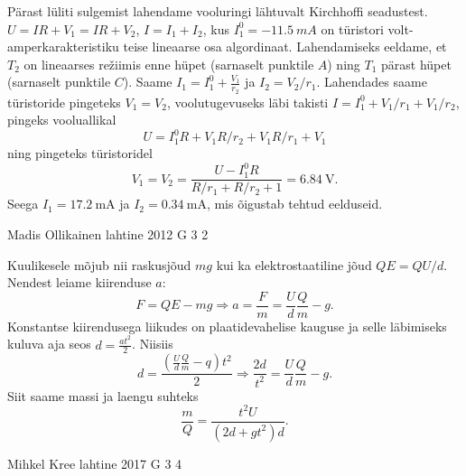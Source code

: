 \documentclass[11pt]{article}
\begin{document}
{{\begin{figure}[h]
\begin{center}
\end{center}
\end{figure}
Pärast lüliti sulgemist lahendame vooluringi lähtuvalt Kirchhoffi seadustest. $U = IR + V_1 = IR + V_2$, $I = I_1 + I_2$, kus $I_1^0=\SI{-11.5}{mA}$ on türistori volt-amperkarakteristiku teise lineaarse osa algordinaat.
Lahendamiseks eeldame, et $T_2$ on lineaarses režiimis enne hüpet (sarnaselt punktile $A$) ning $T_1$ pärast hüpet (sarnaselt punktile $C$). Saame $I_1 = I_1^0 + \frac{V_1}{r_2}$ ja $I_2 = V_2/r_1$. Lahendades saame türistoride pingeteks $V_1 = V_2$, voolutugevuseks läbi takisti $I = I_1^0 + V_1/r_1 + V_1/r_2$, pingeks vooluallikal
\[
U = I_1^0R + V_1R/r_2 + V_1R/r_1 + V_1
\]
ning pingeteks türistoridel
\[
V_1 = V_2 = \frac{U - I_1^0R}{R/r_1 + R/r_2 + 1} = \SI{6.84}{\volt}.
\]
Seega $I_1 = \SI{17.2}{\milli\ampere}$ ja $I_2 = \SI{0.34}{\milli\ampere}$, mis õigustab tehtud eelduseid. 
\fi
}

{Madis Ollikainen} %
{lahtine} %
{2012} %
{G 3} %
{2} %
{

\ifSolution
Kuulikesele mõjub nii raskusjõud $mg$ kui ka elektrostaatiline jõud $QE=QU/d$. Nendest leiame kiirenduse $a$:
\[ F = QE - mg \Rightarrow a = \frac{F}{m} = \frac{U}{d}\frac{Q}{m} - g. \]
Konstantse kiirendusega liikudes on plaatidevahelise kauguse ja selle läbimiseks kuluva aja seos $ d = \frac{at^2}{2} $. Niisiis
\[ d = \frac{\left(\frac{U}{d}\frac{Q}{m} - q\right)t^2}{2} \Rightarrow \frac{2d}{t^2} = \frac{U}{d}\frac{Q}{m} - g. \]
Siit saame massi ja laengu suhteks
\[ \frac{m}{Q} = \frac{t^2U}{\left(2d + gt^2\right)d}. \]
\fi
}

{Mihkel Kree} %
{lahtine} %
{2017} %
{G 3} %
{4} %
{

}}
\end{document}
